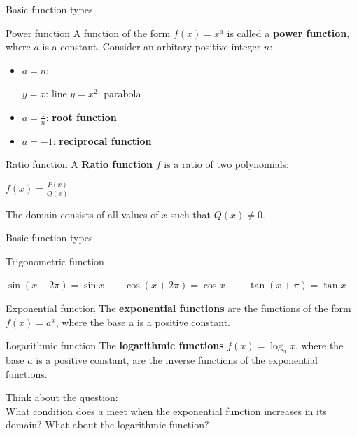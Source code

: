 \begin{frame}{Basic function types}
    \begin{block}{Power function}
        A function of the form $f(x)=x^a$ is called a \textbf{power function}, where $a$ is a constant. Consider an arbitary positive integer $n$:
        \begin{itemize}
            \item $a=n$:\\
                  \begin{center}
                      $y=x$: line \qquad $y=x^2$: parabola
                  \end{center}
            \item $a=\frac{1}{n}$: \textbf{root function}\\
            \item $a=-1$: \textbf{reciprocal function}
        \end{itemize}
    \end{block}
    \begin{block}{Ratio function}
        A \textbf{Ratio function} $f$ is a ratio of two polynomials:
        \begin{center}
            $f(x)=\frac{P(x)}{Q(x)}$
        \end{center}
        The domain consists of all values of $x$ such that $Q(x)\neq 0$.
    \end{block}
\end{frame}

\begin{frame}{Basic function types}
    \begin{block}{Trigonometric function}
        \begin{center}
            $\sin (x+2\pi)=\sin x\qquad \cos (x+2\pi)=\cos x\qquad $
            $\tan (x+\pi)=\tan x$
        \end{center}
    \end{block}
    \begin{block}{Exponential function}
        The \textbf{exponential functions} are the functions of the form $f(x) = a^x$, where the base a is a positive constant.
    \end{block}
    \begin{block}{Logarithmic function}
        The \textbf{logarithmic functions} $f(x) = \log_ax$, where the base $a$ is a positive constant, are the inverse functions of the exponential functions.
    \end{block}
    Think about the question:\\
    What condition does $a$ meet when the exponential function increases in its domain? What about the logarithmic function?
\end{frame}

